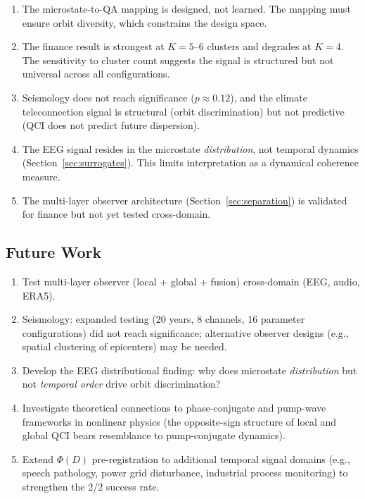 \documentclass[11pt,a4paper]{article}
\begin{document}
\begin{enumerate}
  \item The microstate-to-QA mapping is designed, not learned. The mapping
    must ensure orbit diversity, which constrains the design space.
  \item The finance result is strongest at $K=5$--$6$ clusters and degrades
    at $K=4$. The sensitivity to cluster count suggests the signal is
    structured but not universal across all configurations.
  \item Seismology does not reach significance ($p \approx 0.12$), and the
    climate teleconnection signal is structural (orbit discrimination) but
    not predictive (QCI does not predict future dispersion).
  \item The EEG signal resides in the microstate \emph{distribution}, not
    temporal dynamics (Section~\ref{sec:surrogates}). This limits
    interpretation as a dynamical coherence measure.
  \item The multi-layer observer architecture (Section~\ref{sec:separation})
    is validated for finance but not yet tested cross-domain.
\end{enumerate}

\subsection{Future Work}

\begin{enumerate}
  \item Test multi-layer observer (local + global + fusion) cross-domain (EEG, audio, ERA5).
  \item Seismology: expanded testing (20 years, 8 channels, 16 parameter
    configurations) did not reach significance; alternative observer designs
    (e.g., spatial clustering of epicenters) may be needed.
  \item Develop the EEG distributional finding: why does microstate \emph{distribution}
    but not \emph{temporal order} drive orbit discrimination?
  \item Investigate theoretical connections to phase-conjugate and pump-wave
    frameworks in nonlinear physics (the opposite-sign structure of local
    and global QCI bears resemblance to pump-conjugate dynamics).
  \item Extend $\Phi(D)$ pre-registration to additional temporal signal
    domains (e.g., speech pathology, power grid disturbance, industrial
    process monitoring) to strengthen the 2/2 success rate.
\end{enumerate}
\end{document}
